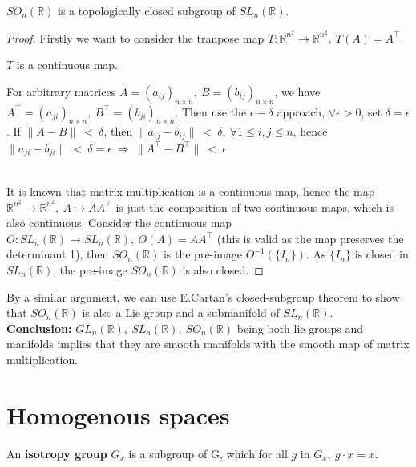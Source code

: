 \documentclass[12pt,twoside]{article}
\begin{document}
\begin{proposition}
$SO_{n}(\mathbb{R})$ is a topologically closed subgroup of $SL_{n}(\mathbb{R})$.
\begin{proof}
Firstly we want to consider the tranpose map $T:\mathbb{R}^{n^2} \rightarrow \mathbb{R}^{n^2},\ T(A) = A^{\top}$.
\begin{claim}
$T$ is a continuous map.
\begin{claimproof}
For arbitrary matrices $A=(a_{ij})_{n\times n},\ B=(b_{ij})_{n\times n}$, we have $A^{\top} = (a_{ji})_{n \times n},\ B^{\top} = (b_{ji})_{n \times n}$. Then use the $\epsilon-\delta$ approach, $\forall \epsilon > 0$, set $\delta = \epsilon$. If $\parallel A-B \parallel\ <\ \delta$, then $\parallel a_{ij}-b_{ij} \parallel \ <\ \delta,\ \forall 1 \leqslant i, j\leqslant n$, hence $\parallel a_{ji}-b_{ji} \parallel \ <\ \delta = \epsilon\  \Rightarrow\  \parallel A^{\top}-B^{\top} \parallel\ <\ \epsilon$
\end{claimproof}
\end{claim}\\
It is known that matrix multiplication is a continuous map, hence the map $\mathbb{R}^{n^2} \rightarrow \mathbb{R}^{n^2},\ A \mapsto AA^{\top}$ is just the composition of two continuous maps, which is also continuous. Consider the continuous map $O:SL_n(\mathbb{R}) \rightarrow SL_n(\mathbb{R}),\ O(A) = AA^{\top}$ (this is valid as the map preserves the determinant 1), then $SO_n(\mathbb{R})$ is the pre-image $O^{-1}(\{I_n\})$. As $\{I_n\}$ is closed in $SL_n(\mathbb{R})$, the pre-image $SO_n(\mathbb{R})$ is also closed.
\end{proof}
\end{proposition}

By a similar argument, we can use E.Cartan's closed-subgroup theorem to show that $SO_{n}(\mathbb{R})$ is also a Lie group and a submanifold of $SL_{n}(\mathbb{R})$.\\
\textbf{Conclusion:} $GL_{n}(\mathbb{R}),\ SL_{n}(\mathbb{R}),\ SO_{n}(\mathbb{R})$ being both lie groups and manifolds implies that they are smooth manifolds with the smooth map of matrix multiplication.
\\

\section{Homogenous spaces}

\begin{definition}
An \textbf{isotropy group}\cite{Rowland} $G_{x}$ is a subgroup of G, which for all $g$ in $G_{x},\ g\cdot x=x$.
\end{definition}
\end{document}
